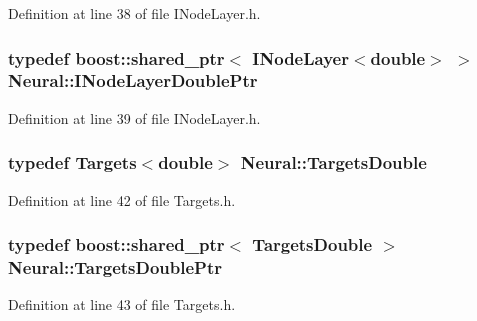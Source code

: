 Definition at line 38 of file INodeLayer.h.

\hypertarget{namespace_neural_a612647db5493ae91ae0bab82ae5a927b}{
\subsubsection[{INodeLayerDoublePtr}]{\setlength{\rightskip}{0pt plus 5cm}typedef boost::shared\_\-ptr$<$ {\bf INodeLayer}$<$double$>$ $>$ {\bf Neural::INodeLayerDoublePtr}}}
\label{namespace_neural_a612647db5493ae91ae0bab82ae5a927b}


Definition at line 39 of file INodeLayer.h.

\hypertarget{namespace_neural_a9db3f6f54dd6f3a52968a6d77138ed04}{
\subsubsection[{TargetsDouble}]{\setlength{\rightskip}{0pt plus 5cm}typedef {\bf Targets}$<$double$>$ {\bf Neural::TargetsDouble}}}
\label{namespace_neural_a9db3f6f54dd6f3a52968a6d77138ed04}


Definition at line 42 of file Targets.h.

\hypertarget{namespace_neural_ae0980fb603c1578bd796144ae1f3c4f7}{
\subsubsection[{TargetsDoublePtr}]{\setlength{\rightskip}{0pt plus 5cm}typedef boost::shared\_\-ptr$<$ {\bf TargetsDouble} $>$ {\bf Neural::TargetsDoublePtr}}}
\label{namespace_neural_ae0980fb603c1578bd796144ae1f3c4f7}


Definition at line 43 of file Targets.h.



